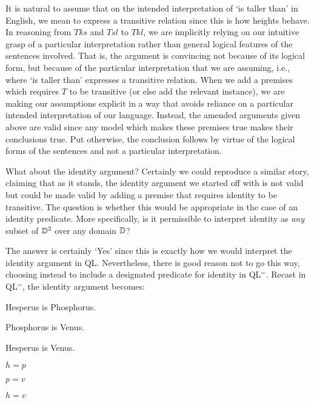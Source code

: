 It is natural to assume that on the intended interpretation of `is taller than' in English, we mean to express a transitive relation since this is how heights behave.
In reasoning from $Tks$ and $Tsl$ to $Tkl$, we are implicitly relying on our intuitive grasp of a particular interpretation rather than general logical features of the sentences involved. 
That is, the argument is convincing not because of its logical form, but because of the particular interpretation that we are assuming, i.e., where `is taller than' expresses a transitive relation.
When we add a premises which requires $T$ to be transitive (or else add the relevant instance), we are making our assumptions explicit in a way that avoids reliance on a particular intended interpretation of our language.
Instead, the amended arguments given above are valid since any model which makes these premises true makes their conclusions true. 
Put otherwise, the conclusion follows by virtue of the logical forms of the sentences and not a particular interpretation.

What about the identity argument?
Certainly we could reproduce a similar story, claiming that as it stands, the identity argument we started off with is not valid but could be made valid by adding a premise that requires identity to be transitive.
The question is whether this would be appropriate in the case of an identity predicate.
More specifically, is it permissible to interpret identity as \textit{any} subset of $\mathbb{D}^2$ over any domain $\mathbb{D}$?

The answer is certainly `Yes' since this is exactly how we would interpret the identity argument in QL.
Nevertheless, there is good reason not to go this way, choosing instead to include a designated predicate for identity in QL$^=$.
Recast in QL$^=$, the identity argument becomes:

\begin{multicols}{2}
  
\begin{earg}
  \item[] Hesperus is Phosphorus.
  \item[] Phosphorus is Venus.
  \item[\therefore] Hesperus is Venus.
\end{earg}

\begin{earg}
  \item[] $h=p$
  \item[] $p=v$
  \item[\therefore] $h=v$
\end{earg}

\end{multicols}

